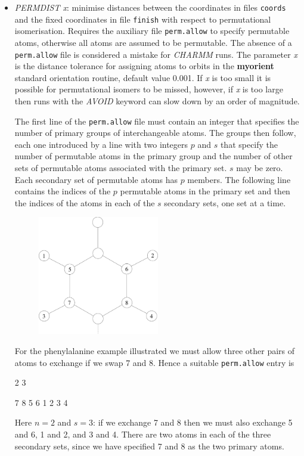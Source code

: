 \documentclass[12pt,a4paper,dvips]{article}
\begin{document}
\begin{itemize}
\item {\it PERMDIST x\/}: minimise distances between 
the coordinates in files {\tt coords} and the
fixed coordinates in file {\tt finish} with respect to permutational isomerisation.
Requires the auxiliary file {\tt perm.allow} to specify permutable atoms, otherwise
all atoms are assumed to be permutable. The absence of a {\tt perm.allow}
file is considered a mistake for {\it CHARMM\/} runs.
The parameter {\it x} is the distance tolerance for assigning atoms to orbits
in the {\bf myorient} standard orientation routine, default value 0.001. 
If {\it x} is too small it is possible for permutational isomers to be missed,
however, if {\it x\/} is too large then runs with the {\it AVOID\/} keyword can
slow down by an order of magnitude.

The first line of the {\tt perm.allow} file must contain an integer
that specifies the number of primary groups of interchangeable atoms.
The groups then follow, each one introduced by a line with two integers $p$ and $s$
that specify the number of permutable atoms in the primary group and the number of other sets
of permutable atoms associated with the primary set.
$s$ may be zero.
Each secondary set of permutable atoms has $p$ members.
The following line contains the indices of the $p$ permutable atoms 
in the primary set and then
the indices of the atoms in each of the $s$ secondary sets, one set at 
a time.

\begin{figure}[hH]
\centerline{\includegraphics[width=0.5\textwidth]{PHE.eps}}
\end{figure}

For the phenylalanine example illustrated we must allow three other pairs of
atoms to exchange if we swap 7 and 8. Hence a suitable {\tt perm.allow} entry is
{

2 3

7 8 5 6 1 2 3 4
}
Here $n=2$ and $s=3$: if we exchange 7 and 8 then we must also exchange 5 and 6,
1 and 2, and 3 and 4. There are two atoms in each of the three secondary sets, 
since we have specified 7 and 8 as the two primary atoms.


\end{itemize}
\end{document}
